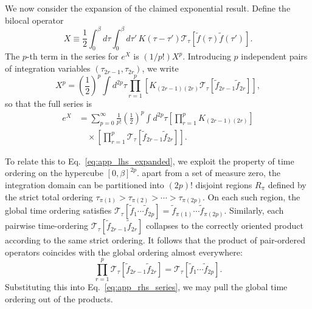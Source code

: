 We now consider the expansion of the claimed exponential result. Define the bilocal operator
\begin{equation}
    X \equiv \frac{1}{2} \int_0^\beta d\tau \int_0^\beta d\tau' \, K(\tau-\tau') \mathcal{T}_\tau \left[ \tilde{f}(\tau) \tilde{f}(\tau') \right].
\end{equation}
The $p$-th term in the series for $e^X$ is $(1/p!) X^p$. Introducing $p$ independent pairs of integration variables $(\tau_{2r-1}, \tau_{2r})$, we write
\begin{equation}
    X^p = \left( \frac{1}{2} \right)^p \int d^{2p}\tau \prod_{r=1}^p \left[ K_{(2r-1)(2r)} \mathcal{T}_\tau \left[ \tilde{f}_{2r-1} \tilde{f}_{2r} \right] \right],
\end{equation}
so that the full series is
\begin{equation}
    \begin{split}
        e^X &= \sum_{p=0}^\infty \frac{1}{p!} \left( \frac{1}{2} \right)^p \int d^{2p}\tau \left[ \prod_{r=1}^p K_{(2r-1)(2r)} \right] \\
        &\quad \times \left[ \prod_{r=1}^p \mathcal{T}_\tau \left[ \tilde{f}_{2r-1} \tilde{f}_{2r} \right] \right].
    \end{split}
    \label{eq:app_rhs_series}
\end{equation}

To relate this to Eq.~\eqref{eq:app_lhs_expanded}, we exploit the property of time ordering on the hypercube $[0,\beta]^{2p}$. apart from a set of measure zero, the integration domain can be partitioned into $(2p)!$ disjoint regions $R_\pi$ defined by the strict total ordering $\tau_{\pi(1)} > \tau_{\pi(2)} > \cdots > \tau_{\pi(2p)}$. On each such region, the global time ordering satisfies $\mathcal{T}_\tau [\tilde{f}_1 \cdots \tilde{f}_{2p}] = \tilde{f}_{\pi(1)} \cdots \tilde{f}_{\pi(2p)}$. Similarly, each pairwise time-ordering $\mathcal{T}_\tau [\tilde{f}_{2r-1} \tilde{f}_{2r}]$ collapses to the correctly oriented product according to the same strict ordering. It follows that the product of pair-ordered operators coincides with the global ordering almost everywhere:
\begin{equation}
    \prod_{r=1}^p \mathcal{T}_\tau \left[ \tilde{f}_{2r-1} \tilde{f}_{2r} \right] = \mathcal{T}_\tau \left[ \tilde{f}_1 \cdots \tilde{f}_{2p} \right].
\end{equation}
Substituting this into Eq.~\eqref{eq:app_rhs_series}, we may pull the global time ordering out of the products.

